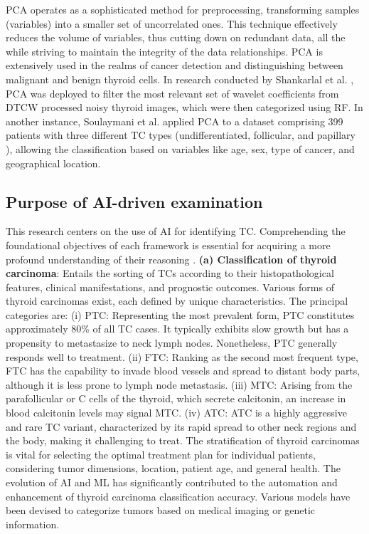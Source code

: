 \documentclass[a4paper,fleqn]{cas-sc}
\begin{document}
\Ac{PCA} operates as a sophisticated method for preprocessing, transforming samples (variables) into a smaller set of uncorrelated ones. This technique effectively reduces the volume of variables, thus cutting down on redundant data, all the while striving to maintain the integrity of the data relationships. \ac{PCA} is extensively used in the realms of cancer detection and distinguishing between malignant and benign thyroid cells. In research conducted by Shankarlal et al. \cite{shankarlal2020performance}, \ac{PCA} was deployed to filter the most relevant set of wavelet coefficients from \ac{DTCW} processed noisy thyroid images, which were then categorized using \ac{RF}. In another instance, Soulaymani et al. \cite{soulaymani2018epidemiological} applied \ac{PCA} to a dataset comprising 399 patients with three different TC types (undifferentiated, follicular,  and papillary ), allowing the classification based on variables like age, sex, type of cancer, and geographical location.


\subsection{Purpose of AI-driven examination }
This research centers on the use of \ac{AI} for identifying TC. Comprehending the foundational objectives of each framework is essential for acquiring a more profound understanding of their reasoning \cite{habchi2023ai}.
\vskip2mm
\noindent \textbf{(a) Classification of thyroid carcinoma}: Entails the sorting of TCs according to their histopathological features, clinical manifestations, and prognostic outcomes. Various forms of thyroid carcinomas exist, each defined by unique characteristics. The principal categories are: (i) \ac{PTC}: Representing the most prevalent form, \ac{PTC} constitutes approximately 80\% of all TC cases. It typically exhibits slow growth but has a propensity to metastasize to neck lymph nodes. Nonetheless, \ac{PTC} generally responds well to treatment. (ii) \ac{FTC}: Ranking as the second most frequent type, \ac{FTC} has the capability to invade blood vessels and spread to distant body parts, although it is less prone to lymph node metastasis. (iii) \ac{MTC}: Arising from the parafollicular or C cells of the thyroid, which secrete calcitonin, an increase in blood calcitonin levels may signal \ac{MTC}. (iv) \ac{ATC}: \ac{ATC} is a highly aggressive and rare TC variant, characterized by its rapid spread to other neck regions and the body, making it challenging to treat. The stratification of thyroid carcinomas is vital for selecting the optimal treatment plan for individual patients, considering tumor dimensions, location, patient age, and general health. The evolution of \ac{AI} and \ac{ML} has significantly contributed to the automation and enhancement of thyroid carcinoma classification accuracy. Various models have been devised to categorize tumors based on medical imaging or genetic information.
\end{document}
